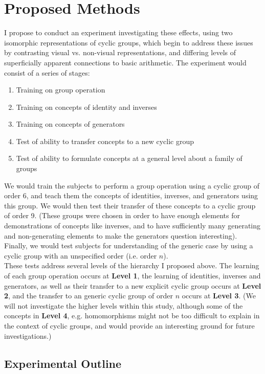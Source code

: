 \documentclass[11pt]{article}
\begin{document}
\section{Proposed Methods} 
I propose to conduct an experiment investigating these effects, using two isomorphic representations of cyclic groups, which begin to address these issues by contrasting visual vs. non-visual representations, and differing levels of superficially apparent connections to basic arithmetic. The experiment would consist of a series of stages:  
\begin{enumerate}
\item Training on group operation
\item Training on concepts of identity and inverses
\item Training on concepts of generators
\item Test of ability to transfer concepts to a new cyclic group
\item Test of ability to formulate concepts at a general level about a family of groups
\end{enumerate}
We would train the subjects to perform a group operation using a cyclic group of order 6, and teach them the concepts of identities, inverses, and generators using this group. We would then test their transfer of these concepts to a cyclic group of order 9. (These groups were chosen in order to have enough elements for demonstrations of concepts like inverses, and to have sufficiently many generating and non-generating elements to make the generators question interesting). Finally, we would test subjects for understanding of the generic case by using a cyclic group with an unspecified order (i.e. order $n$). \\[11pt]
These tests address several levels of the hierarchy I proposed above. The learning of each group operation occurs at \textbf{Level 1}, the learning of identities, inverses and generators, as well as their transfer to a new explicit cyclic group occurs at \textbf{Level 2}, and the transfer to an generic cyclic group of order $n$ occurs at \textbf{Level 3}. (We will not investigate the higher levels within this study, although some of the concepts in \textbf{Level 4}, e.g. homomorphisms might not be too difficult to explain in the context of cyclic groups, and would provide an interesting ground for future investigations.)  
\subsection{Experimental Outline}
\end{document}
